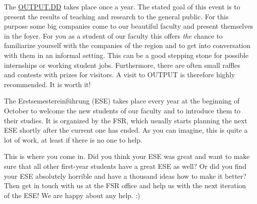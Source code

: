 
The 
\href{https://output-dd.de}{OUTPUT.DD}
takes place once a year. The stated goal of this event is to present the results of teaching and research to the general public. For this purpose some big companies come to our beautiful faculty and present themselves in the foyer. For you as a student of our faculty this offers \emph{the} chance to familiarize yourself with the companies of the region and to get into conversation with them in an informal setting. This can be a good stepping stone for possible internships or working student jobs. Furthermore, there are often small raffles and contests with prizes for visitors. A visit to OUTPUT is therefore highly recommended. It is worth it!


The Erstsemestereinführung (ESE) takes place every year at the beginning of October to welcome the new students of our faculty and to introduce them to their studies. 
It is organized by the FSR, which usually starts planning the next ESE shortly after the current one has ended. As you can imagine, this is quite a lot of work, at least if there is no one to help.

This is where you come in. Did you think your ESE was great and want to make sure that all other first-year students have a great ESE as well? Or did you find your ESE absolutely horrible and have a thousand ideas how to make it better? Then get in touch with us at the FSR office and help us with the next iteration of the ESE! We are happy about any help. :)



